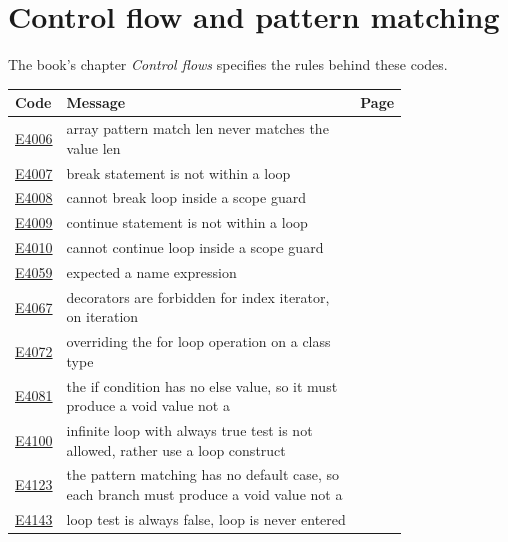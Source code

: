 
\clearpage
\section{Control flow and pattern matching}
\label{sec:codes:flow}

The book's chapter \textit{Control flows} specifies the rules behind these codes.

\begin{longtable}{@{}l p{0.78\linewidth} r@{}}
\toprule Code & Message & Page\\ \midrule \endhead
\hyperref[sec:codes:e4006]{E4006} & array pattern match len \errhole{} never matches the value len \errhole{} & \pageref{sec:codes:e4006}\\
\hyperref[sec:codes:e4007]{E4007} & break statement is not within a loop & \pageref{sec:codes:e4007}\\
\hyperref[sec:codes:e4008]{E4008} & cannot break loop inside a scope guard & \pageref{sec:codes:e4008}\\
\hyperref[sec:codes:e4009]{E4009} & continue statement is not within a loop & \pageref{sec:codes:e4009}\\
\hyperref[sec:codes:e4010]{E4010} & cannot continue loop inside a scope guard & \pageref{sec:codes:e4010}\\
\hyperref[sec:codes:e4059]{E4059} & expected a name expression & \pageref{sec:codes:e4059}\\
\hyperref[sec:codes:e4067]{E4067} & decorators are forbidden for index iterator, on \errhole{} iteration & \pageref{sec:codes:e4067}\\
\hyperref[sec:codes:e4072]{E4072} & overriding the for loop operation on a class type \errhole{} & \pageref{sec:codes:e4072}\\
\hyperref[sec:codes:e4081]{E4081} & the if condition has no else value, so it must produce a void value not a \errhole{} & \pageref{sec:codes:e4081}\\
\hyperref[sec:codes:e4100]{E4100} & infinite loop with always true test is not allowed, rather use a loop construct & \pageref{sec:codes:e4100}\\
\hyperref[sec:codes:e4123]{E4123} & the pattern matching has no default case, so each branch must produce a void value not a \errhole{} & \pageref{sec:codes:e4123}\\
\hyperref[sec:codes:e4143]{E4143} & loop test is always false, loop is never entered & \pageref{sec:codes:e4143}\\

\end{longtable}

